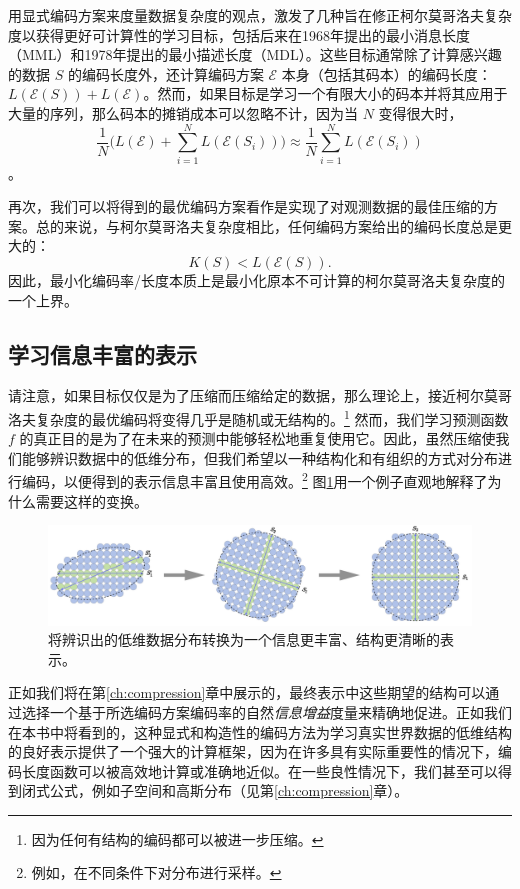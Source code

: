 \documentclass[../../book-main.tex]{subfiles}
\begin{document}
\begin{remark}\label{rem:computable-complexity}
    {用显式编码方案来度量数据复杂度的观点，激发了几种旨在修正柯尔莫哥洛夫复杂度以获得更好可计算性的学习目标\cite{WallaceC1999}，包括后来在1968年提出的最小消息长度（MML）\cite{WallaceC1968}和1978年提出的最小描述长度（MDL）\cite{Rissanen-1978,HansenM2001}。这些目标通常除了计算感兴趣的数据 $S$ 的编码长度外，还计算编码方案 $\mathcal{E}$ 本身（包括其码本）的编码长度：$L(\mathcal E(S)) + L(\mathcal E)$。然而，如果目标是学习一个有限大小的码本并将其应用于大量的序列，那么码本的摊销成本可以忽略不计，因为当 $N$ 变得很大时，$$\frac{1}{N}\Big( L(\mathcal{E}) + \sum_{i=1}^N L(\mathcal{E}(S_i))\Big) \approx \frac{1}{N}\sum_{i=1}^N L(\mathcal{E}(S_i))$$。}
\end{remark}

再次，我们可以将得到的最优编码方案看作是实现了对观测数据的最佳压缩的方案。总的来说，与柯尔莫哥洛夫复杂度相比，任何编码方案给出的编码长度总是更大的：
\begin{equation}
    K(S) < L( \mathcal E(S)).
\end{equation} 
因此，最小化编码率/长度本质上是最小化原本不可计算的柯尔莫哥洛夫复杂度的一个上界。

\subsection{学习信息丰富的表示}
请注意，如果目标仅仅是为了压缩而压缩给定的数据，那么理论上，接近柯尔莫哥洛夫复杂度的最优编码将变得几乎是随机或无结构的\cite{Chaitin-1966}。\footnote{因为任何有结构的编码都可以被进一步压缩。} 然而，我们学习预测函数 $f$ 的真正目的是为了在未来的预测中能够轻松地重复使用它。因此，虽然压缩使我们能够辨识数据中的低维分布，但我们希望以一种结构化和有组织的方式对分布进行编码，以便得到的表示信息丰富且使用高效。\footnote{例如，在不同条件下对分布进行采样。} 图\ref{fig:expansion}用一个例子直观地解释了为什么需要这样的变换。

\begin{figure}
    \centering
    \includegraphics[width=0.98\linewidth]{figs_chap4/coding-transform.png}
    \caption{将辨识出的低维数据分布转换为一个信息更丰富、结构更清晰的表示。}
    \label{fig:expansion}
\end{figure}
正如我们将在第\ref{ch:compression}章中展示的，最终表示中这些期望的结构可以通过选择一个基于所选编码方案编码率的自然{\em 信息增益}度量来精确地促进。正如我们在本书中将看到的，这种显式和构造性的编码方法为学习真实世界数据的低维结构的良好表示提供了一个强大的计算框架，因为在许多具有实际重要性的情况下，编码长度函数可以被高效地计算或准确地近似。在一些良性情况下，我们甚至可以得到闭式公式，例如子空间和高斯分布（见第\ref{ch:compression}章）。
\end{document}
